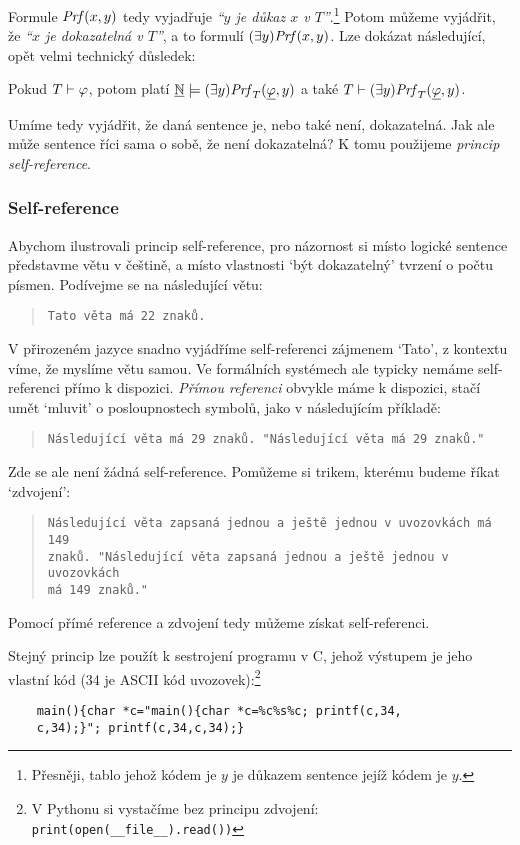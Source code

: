 Formule $\mathit{Prf}(x,y)$ tedy vyjadřuje \emph{``$y$ je důkaz $x$ v $T$''}.\footnote{Přesněji, tablo jehož kódem je $y$ je důkazem sentence jejíž kódem je $y$.} Potom můžeme vyjádřit, že \emph{``$x$ je dokazatelná v $T$''}, a to formulí $(\exists y)\mathit{Prf}(x,y)$. Lze dokázat následující, opět velmi technický důsledek:

\begin{corollary}
    Pokud $T\vdash\varphi$, potom platí $\underline{\mathbb N}\models (\exists y)\mathit{Prf}_T(\underline{\varphi},y)$ a také $T\vdash (\exists y)\mathit{Prf}_T(\underline{\varphi}  ,y)$.
\end{corollary}

Umíme tedy vyjádřit, že daná sentence je, nebo také není, dokazatelná. Jak ale může sentence říci sama o sobě, že není dokazatelná? K tomu použijeme \emph{princip self-reference}.

\subsubsection*{Self-reference}

Abychom ilustrovali princip self-reference, pro názornost si místo logické sentence představme větu v češtině, a místo vlastnosti `být dokazatelný' tvrzení o počtu písmen. Podívejme se na následující větu:
\begin{quote}
    \texttt{Tato věta má 22 znaků.}
\end{quote}
V přirozeném jazyce snadno vyjádříme self-referenci zájmenem `Tato', z kontextu víme, že myslíme větu samou. Ve formálních systémech ale typicky nemáme self-referenci přímo k dispozici. \emph{Přímou referenci} obvykle máme k dispozici, stačí umět `mluvit' o posloupnostech symbolů, jako v následujícím příkladě:
\begin{quote}
    \texttt{Následující věta má 29 znaků. "Následující věta má 29 znaků."}
\end{quote}
Zde se ale není žádná self-reference. Pomůžeme si trikem, kterému budeme říkat `zdvojení':
\begin{quote}
    \texttt{Následující věta zapsaná jednou a ještě jednou v uvozovkách má 149\\ znaků. "Následující věta zapsaná jednou a ještě jednou v uvozovkách\\ má 149 znaků."}
\end{quote}
Pomocí přímé reference a zdvojení tedy můžeme získat self-referenci. 

\begin{remark}
    Stejný princip lze použít k sestrojení programu v C, jehož výstupem je jeho vlastní kód (34 je ASCII kód uvozovek):\footnote{V Pythonu si vystačíme bez principu zdvojení: \texttt{print(open(\_\_file\_\_).read())}}
\begin{verbatim}
    main(){char *c="main(){char *c=%c%s%c; printf(c,34,
    c,34);}"; printf(c,34,c,34);}    
\end{verbatim}
\end{remark}

